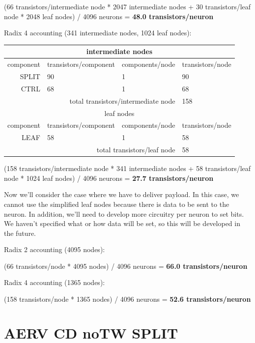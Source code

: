 \documentclass{article}
\begin{document}
(66 transistors/intermediate node * 2047 intermediate nodes + 30 transistors/leaf node * 2048 leaf nodes) / 4096 neurons = \textbf{48.0 transistors/neuron}

\noindent
Radix 4 accounting (341 intermediate nodes, 1024 leaf nodes):

\begin{center}
    \begin{tabular}{|r|l|l|l|}
    \hline \multicolumn{4}{|c|}{intermediate nodes} \\ \hline
    component & transistors/component & components/node & transistors/node \\ \hline
    SPLIT & 90 & 1 & 90 \\ \hline
    CTRL & 68 & 1 & 68 \\ \hline
    \hline \multicolumn{3}{|r|}{total transistors/intermediate node} & 158 \\ \hline
    \hline \multicolumn{4}{|c|}{leaf nodes} \\ \hline
    component & transistors/component & components/node & transistors/node \\ \hline
    LEAF & 58 & 1 & 58 \\ \hline
    \hline \multicolumn{3}{|r|}{total transistors/leaf node} & 58 \\ \hline
    \end{tabular}
\end{center}

(158 transistors/intermediate node * 341 intermediate nodes + 58 transistors/leaf node * 1024 leaf nodes) / 4096 neurons = \textbf{27.7 transistors/neuron}

Now we'll consider the case where we have to deliver payload. In this case, we cannot use the simplified leaf nodes because there is data to be sent to the neuron. In addition, we'll need to develop more circuitry per neuron to set bits. We haven't specified what or how data will be set, so this will be developed in the future.

\noindent
Radix 2 accounting (4095 nodes):

(66 transistors/node * 4095 nodes) / 4096 neurons = \textbf{66.0 transistors/neuron}

\noindent
Radix 4 accounting (1365 nodes):

(158 transistors/node * 1365 nodes) / 4096 neurons = \textbf{52.6 transistors/neuron}

\section{AERV CD noTW SPLIT \label{sec:AERV_CD_noTW_SPLIT}}
\end{document}
